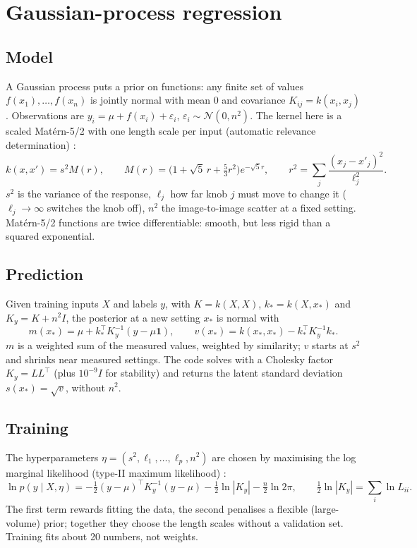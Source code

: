 \documentclass[10pt,a4paper]{article}
\newcommand{\one}{\mathbf 1}
\begin{document}
\section{Gaussian-process regression}\label{sec:gp}

\subsection{Model}
A Gaussian process \cite{rasmussen2006} puts a prior on functions: any finite set of values $f(x_1),\dots,f(x_n)$ is jointly
normal with mean 0 and covariance $K_{ij}=k(x_i,x_j)$. Observations are $y_i=\mu+f(x_i)+\varepsilon_i$,
$\varepsilon_i\sim\mathcal N(0,n^2)$. The kernel here is a scaled Matérn-5/2 with one length scale per input
(automatic relevance determination) \cite{rasmussen2006,stein1999}:
\begin{equation}
k(x,x')=s^2M(r),\qquad M(r)=\Big(1+\sqrt5\,r+\tfrac53r^2\Big)e^{-\sqrt5 r},\qquad r^2=\sum_{j}\frac{(x_j-x'_j)^2}{\ell_j^2}.
\end{equation}
$s^2$ is the variance of the response, $\ell_j$ how far knob $j$ must move to change it ($\ell_j\to\infty$ switches the knob
off), $n^2$ the image-to-image scatter at a fixed setting. Matérn-5/2 functions are twice differentiable: smooth, but less
rigid than a squared exponential.

\subsection{Prediction}
Given training inputs $X$ and labels $y$, with $K=k(X,X)$, $k_*=k(X,x_*)$ and $K_y=K+n^2I$, the posterior at a new
setting $x_*$ is normal with
\begin{equation}
m(x_*)=\mu+k_*^\top K_y^{-1}(y-\mu\one),\qquad
v(x_*)=k(x_*,x_*)-k_*^\top K_y^{-1}k_* .
\label{eq:gppost}
\end{equation}
$m$ is a weighted sum of the measured values, weighted by similarity; $v$ starts at $s^2$ and shrinks near measured settings.
The code solves with a Cholesky factor $K_y=LL^\top$ (plus $10^{-9}I$ for stability) and returns the latent standard deviation
$s(x_*)=\sqrt{v}$, without $n^2$.

\subsection{Training}
The hyperparameters $\eta=(s^2,\ell_1,\dots,\ell_p,n^2)$ are chosen by maximising the log marginal likelihood (type-II
maximum likelihood) \cite{rasmussen2006}:
\begin{equation}
\ln p(y\mid X,\eta)=-\tfrac12(y-\mu)^\top K_y^{-1}(y-\mu)-\tfrac12\ln|K_y|-\tfrac n2\ln2\pi,
\qquad \tfrac12\ln|K_y|=\textstyle\sum_i\ln L_{ii}.
\label{eq:lml}
\end{equation}
The first term rewards fitting the data, the second penalises a flexible (large-volume) prior; together they choose the
length scales without a validation set. Training fits about 20 numbers, not weights.
\end{document}
